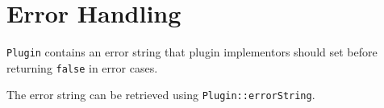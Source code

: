 
\section{Error Handling}

{\tt Plugin} contains an error string that plugin implementors
should set before returning {\tt false} in error cases.

The error string can be retrieved using {\tt Plugin::errorString}.
